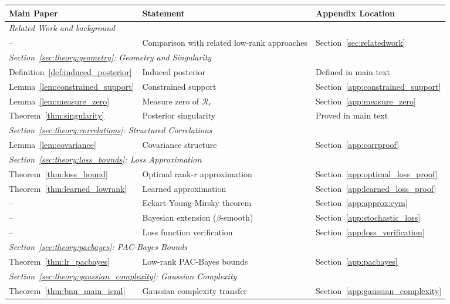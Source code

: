 \documentclass{article}
\theoremstyle{plain}
\theoremstyle{definition}
\theoremstyle{remark}
\begin{document}
\begin{table}[h]
\centering
\small
\begin{tabular}{lll}
\toprule
\textbf{Main Paper} & \textbf{Statement} & \textbf{Appendix Location} \\
\midrule
\multicolumn{3}{l}{\textit{Related Work and background}} \\
-- & Comparison with related low-rank approaches & Section~\ref{sec:relatedwork} \\
\midrule
\multicolumn{3}{l}{\textit{Section~\ref{sec:theory:geometry}: Geometry and Singularity}} \\
Definition~\ref{def:induced_posterior} & Induced posterior & Defined in main text \\
Lemma~\ref{lem:constrained_support} & Constrained support & Section~\ref{app:constrained_support} \\
Lemma~\ref{lem:measure_zero} & Measure zero of $\mathcal{R}_r$ & Section~\ref{app:measure_zero} \\
Theorem~\ref{thm:singularity} & Posterior singularity & Proved in main text \\
\midrule
\multicolumn{3}{l}{\textit{Section~\ref{sec:theory:correlations}: Structured Correlations}} \\
Lemma~\ref{lem:covariance} & Covariance structure & Section~\ref{app:corrproof} \\
\midrule
\multicolumn{3}{l}{\textit{Section~\ref{sec:theory:loss_bounds}: Loss Approximation}} \\
Theorem~\ref{thm:loss_bound} & Optimal rank-$r$ approximation & Section~\ref{app:optimal_loss_proof} \\
Theorem~\ref{thm:learned_lowrank} & Learned approximation & Section~\ref{app:learned_loss_proof} \\
-- & Eckart-Young-Mirsky theorem & Section~\ref{app:approx:eym} \\
-- & Bayesian extension ($\beta$-smooth) & Section~\ref{app:stochastic_loss} \\
-- & Loss function verification & Section~\ref{app:loss_verification} \\
\midrule
\multicolumn{3}{l}{\textit{Section~\ref{sec:theory:pacbayes}: PAC-Bayes Bounds}} \\
Theorem~\ref{thm:lr_pacbayes} & Low-rank PAC-Bayes bounds & Section~\ref{app:pacbayes} \\
\midrule
\multicolumn{3}{l}{\textit{Section~\ref{sec:theory:gaussian_complexity}: Gaussian Complexity}} \\
Theorem~\ref{thm:bnn_main_icml} & Gaussian complexity transfer & Section~\ref{app:gaussian_complexity} \\

\end{tabular}
\end{table}
\end{document}
